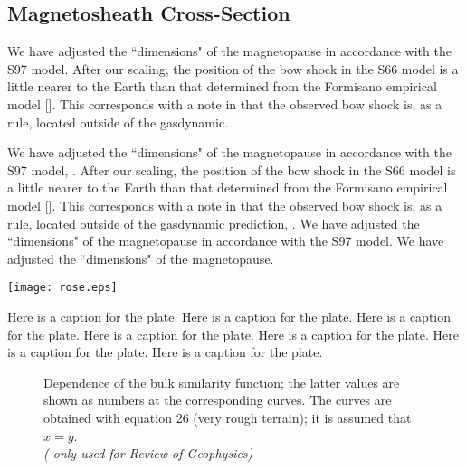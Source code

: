 \documentclass[jgrga]{agu2001}
\begin{document}
\begin{article}
\subsection{Magnetosheath Cross-Section}
We have adjusted the ``dimensions" of the magnetopause in accordance
with the S97 model. After our scaling, the
position of the bow shock in the S66 model is a little nearer to
the Earth than that determined from the Formisano empirical model
[]. 
This corresponds with a
note in  that the observed
bow shock is, as a rule, located outside of the gasdynamic.



We have adjusted the ``dimensions" of the magnetopause in accordance
with the S97 model, . After our scaling, the
position of the bow shock in the S66 model is a little nearer to
the Earth than that determined from the Formisano empirical model
[]. 
This corresponds with a
note in  that the observed
bow shock is, as a rule, located outside of the gasdynamic prediction,
.
We have adjusted the ``dimensions" of the magnetopause in accordance
with the S97 model.
We have adjusted the ``dimensions" of the magnetopause.

\begin{plate*}[t]
\vspace*{-8pt}
\centerline{\texttt{[image: rose.eps]}}
\caption{Here is a caption for the plate.
Here is a caption for the plate.
Here is a caption for the plate.
Here is a caption for the plate.
Here is a caption for the plate.
Here is a caption for the plate.
Here is a caption for the plate.}
\label{plateone}
\end{plate*}

 \begin{figure*}[b]
 {
 Dependence of the bulk similarity function; the latter values are shown as
 numbers at the corresponding curves. The curves are obtained with equation 26
 (very rough terrain); it is assumed that $x=y$.\\[6pt]
 {\it({\tt\string\sidecaption\string{\string}\string{\string}} only used for
 Review of Geophysics)}} 
 \label{figfive}
 \end{figure*}





\end{article}
\end{document}
